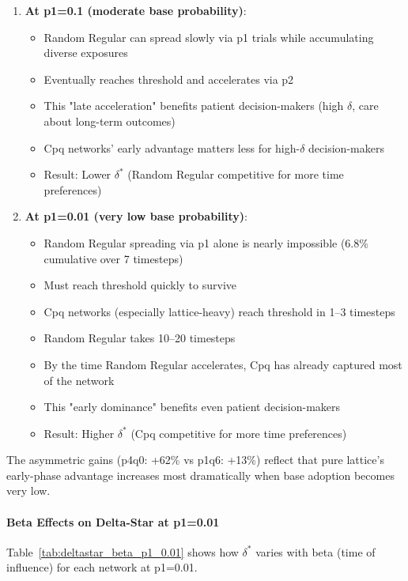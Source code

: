 \documentclass[12pt,a4paper]{article}
\begin{document}
\begin{enumerate}
    \item \textbf{At p1=0.1 (moderate base probability)}:
    \begin{itemize}
        \item Random Regular can spread slowly via p1 trials while accumulating diverse exposures
        \item Eventually reaches threshold and accelerates via p2
        \item This "late acceleration" benefits patient decision-makers (high $\delta$, care about long-term outcomes)
        \item Cpq networks' early advantage matters less for high-$\delta$ decision-makers
        \item Result: Lower $\delta^*$ (Random Regular competitive for more time preferences)
    \end{itemize}

    \item \textbf{At p1=0.01 (very low base probability)}:
    \begin{itemize}
        \item Random Regular spreading via p1 alone is nearly impossible (6.8\% cumulative over 7 timesteps)
        \item Must reach threshold quickly to survive
        \item Cpq networks (especially lattice-heavy) reach threshold in 1--3 timesteps
        \item Random Regular takes 10--20 timesteps
        \item By the time Random Regular accelerates, Cpq has already captured most of the network
        \item This "early dominance" benefits even patient decision-makers
        \item Result: Higher $\delta^*$ (Cpq competitive for more time preferences)
    \end{itemize}
\end{enumerate}

The asymmetric gains (p4q0: +62\% vs p1q6: +13\%) reflect that pure lattice's early-phase advantage increases most dramatically when base adoption becomes very low.

\paragraph{Beta Effects on Delta-Star at p1=0.01}

Table~\ref{tab:deltastar_beta_p1_0.01} shows how $\delta^*$ varies with beta (time of influence) for each network at p1=0.01.
\end{document}
